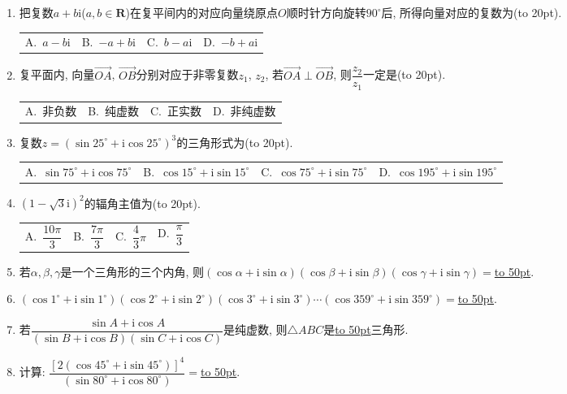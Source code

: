 \documentclass[10pt,a4paper]{article}
\newcommand{\blank}[1]{\underline{\hbox to #1pt{}}}
\newcommand{\bracket}[1]{(\hbox to #1pt{})}
\newcommand{\fourch}[4]{\par\begin{tabular}{p{.23\textwidth}p{.23\textwidth}p{.23\textwidth}p{.23\textwidth}}
A.~#1 &B.~#2& C.~#3& D.~#4
\end{tabular}}
\begin{document}
\begin{enumerate}[1.]
\begin{center}
\end{center}
\fourch{点$B$}{点$C$}{点$D$}{点$E$}
\item 把复数$a+b\mathrm{i}$($a,b\in \mathbf{R}$)在复平间内的对应向量绕原点$O$顺时针方向旋转$90^\circ$后, 所得向量对应的复数为\bracket{20}.
\fourch{$a-b\mathrm{i}$}{$-a+b\mathrm{i}$}{$b-a\mathrm{i}$}{$-b+a\mathrm{i}$}
\item 复平面内, 向量$\overrightarrow{OA}$, $\overrightarrow{OB}$分别对应于非零复数$z_1$, $z_2$, 若$\overrightarrow{OA}\perp \overrightarrow{OB}$, 则$\dfrac{z_2}{z_1}$一定是\bracket{20}.
\fourch{非负数}{纯虚数}{正实数}{非纯虚数}
\item 复数$z=(\sin 25^\circ +\mathrm{i}\cos 25^\circ)^3$的三角形式为\bracket{20}.
\fourch{$\sin 75^\circ +\mathrm{i}\cos 75^\circ$}{$\cos 15^\circ +\mathrm{i}\sin 15^\circ$}{$\cos 75^\circ +\mathrm{i}\sin 75^\circ$}{$\cos 195^\circ +\mathrm{i}\sin 195^\circ$}
\item $(1-\sqrt 3\mathrm{i})^2$的辐角主值为\bracket{20}.
\fourch{$\dfrac{10\pi }3$}{$\dfrac{7\pi }3$}{$\dfrac 43\pi$}{$\dfrac{\pi }3$}
\item 若$\alpha ,\beta ,\gamma$是一个三角形的三个内角, 则$(\cos \alpha +\mathrm{i}\sin \alpha)(\cos \beta +\mathrm{i}\sin \beta)(\cos \gamma +\mathrm{i}\sin \gamma)=$\blank{50}.
\item $(\cos 1^\circ +\mathrm{i}\sin 1^\circ)(\cos 2^\circ +\mathrm{i}\sin 2^\circ)(\cos 3^\circ +\mathrm{i}\sin 3^\circ)\cdots (\cos 359^\circ +\mathrm{i}\sin 359^\circ)=$\blank{50}.
\item 若$\dfrac{\sin A+\mathrm{i}\cos A}{(\sin B+\mathrm{i}\cos B)(\sin C+\mathrm{i}\cos C)}$是纯虚数, 则$\triangle ABC$是\blank{50}三角形.
\item 计算: $\dfrac{[2(\cos 45^\circ +\mathrm{i}\sin 45^\circ)]^4}{(\sin 80^\circ +\mathrm{i}\cos 80^\circ)}=$\blank{50}.

\end{enumerate}
\end{document}
